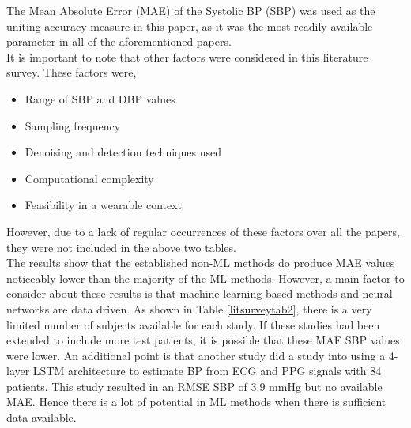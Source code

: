  \noindent The Mean Absolute Error (MAE) of the Systolic BP (SBP) was used as the uniting accuracy measure in this paper, as it was the most readily available parameter in all of the aforementioned papers. \\ \newline \noindent It is important to note that other factors were considered in this literature survey. These factors were, \begin{itemize}
    \item Range of SBP and DBP values 
    \item Sampling frequency
    \item Denoising and detection techniques used
    \item Computational complexity
    \item Feasibility in a wearable context
\end{itemize}\noindent However, due to a lack of regular occurrences of these factors over all the papers, they were not included in the above two tables.\\ \newline \noindent The results show that the established non-ML methods do produce MAE values noticeably lower than the majority of the ML methods. However, a main factor to consider about these results is that machine learning based methods and neural networks are data driven. As shown in Table \ref{litsurveytab2}, there is a very limited number of subjects available for each study. If these studies had been extended to include more test patients, it is possible that these MAE SBP values were lower. An additional point is that another study \cite{Su2017} did a study into using a 4-layer LSTM architecture to estimate BP from ECG and PPG signals with 84 patients. This study resulted in an RMSE SBP of $3.9$ mmHg but no available MAE. Hence there is a lot of potential in ML methods when there is sufficient data available.

